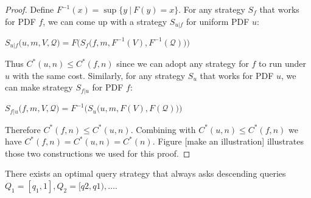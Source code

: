 \begin{proof}

Define $F^{-1}(x) = \sup\{y ~|~ F(y) = x\}$. For any strategy $S_f$ that works
for PDF $f$, we can come up with a strategy $S_{u|f}$ for uniform PDF $u$:

$
S_{u|f}\big(u, m, V, \mathcal Q \big) = F\Big( S_f\big( f, m, F^{-1}(V), F^{-1} (\mathcal Q) \big) \Big)
$

Thus $C^*(u, n) \leq C^*(f, n)$ since we can adopt any strategy for $f$ to run
under $u$ with the same cost.  Similarly, for any strategy $S_u$ that works for
PDF $u$, we can make strategy $S_{f|u}$ for PDF $f$:

$
S_{f|u}\big(f, m, V, \mathcal Q \big) = F^{-1}\Big( S_u\big( u, m, F(V), F (\mathcal Q) \big) \Big)
$

Therefore $C^*(f, n) \leq C^*(u, n)$. Combining with $C^*(u, n) \leq C^*(f, n)$
we have $C^*(f, n) = C^*(u, n) = C^*(n)$. Figure [make an illustration]
illustrates those two constructions we used for this proof.

\end{proof}

\begin{lemma}

There exists an optimal query strategy that always asks descending queries
$Q_1 = [q_1, 1], Q_2 = [q2, q1), \ldots$.

\end{lemma}

